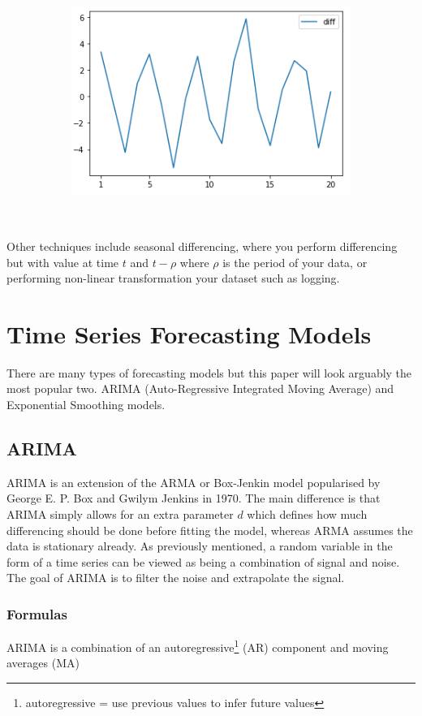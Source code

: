 \documentclass{article}
\begin{document}
\begin{flushleft}
\begin{figure}[H]
\begin{subfigure}[b]{0.3\linewidth}
      \end{subfigure}
      \begin{subfigure}[b]{0.6\linewidth}
        \includegraphics[height=80mm, width=120mm]{regression_plot.png}
      \end{subfigure}
    \end{figure}
    Other techniques include seasonal differencing, where you perform differencing but with value at time $t$ and $t-\rho$ where $\rho$ is the period of your data, or performing non-linear transformation your dataset such as logging.
  \end{flushleft}
  \newpage
  \section{Time Series Forecasting Models}
  There are many types of forecasting models but this paper will look arguably the most popular two. ARIMA (Auto-Regressive Integrated Moving Average) and Exponential Smoothing models. 
  \subsection{ARIMA}
  ARIMA is an extension of the ARMA or Box-Jenkin model popularised by George E. P. Box and Gwilym Jenkins in 1970. The main difference is that ARIMA simply allows for an extra parameter $d$ which defines how much differencing should be done before fitting the model, whereas ARMA assumes the data is stationary already. 
  As previously mentioned, a random variable in the form of a time series can be viewed as being a combination of signal and noise. The goal of ARIMA is to filter the noise and extrapolate the signal.
  \subsubsection{Formulas}
  ARIMA is a combination of an autoregressive\footnote{autoregressive = use previous values to infer future values} (AR) component and moving averages (MA)
\end{document}
